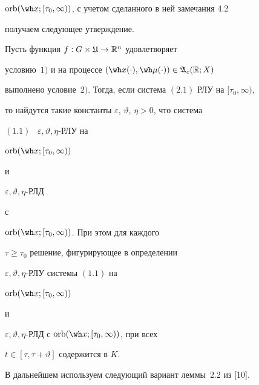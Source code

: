 $\orb(\wh x;[\tau_0,\infty))$, с учетом сделанного в ней замечания 4.2


получаем следующее утверждение.








\begin{thms}


Пусть функция $f:G\times\frak U\to\Bbb R^n$ удовлетворяет


условию~$1)$ и на процессе $(\wh x(\cdot),\wh\mu(\cdot))


\in\frak A_c(\Bbb R;X)$


выполнено условие~$2)$. Тогда, если система $(2.1)$ РЛУ на $[\tau_0,\infty)$,


то найдутся такие константы $\varepsilon$, $\vartheta$, $\eta>0$, что система


$(1.1)$ \ $\varepsilon,\vartheta,\eta$-РЛУ на


$\orb(\wh x;[\tau_0,\infty))$


и


$\varepsilon,\vartheta,\eta$-РЛД


с


$\orb(\wh x;[\tau_0,\infty))$. При этом для каждого


$\tau\ge\tau_0$ решение, фигурирующее в определении


$\varepsilon,\vartheta,\eta$-РЛУ системы $(1.1)$ на


$\orb(\wh x;[\tau_0,\infty))$


и


$\varepsilon,\vartheta,\eta$-РЛД с $\orb(\wh x;[\tau_0,\infty))$, при всех


$t\in[\tau,\tau+\vartheta]$ содержится в $K$.


\end{thms}





В дальнейшем используем следующий вариант леммы~2.2 из [10].








